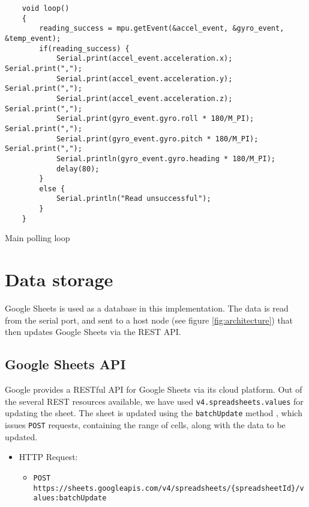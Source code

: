 \documentclass[./main.tex]{subfiles}
\begin{document}
\begin{code}
    \begin{verbatim}
    void loop()
    {
        reading_success = mpu.getEvent(&accel_event, &gyro_event, &temp_event);
        if(reading_success) {
            Serial.print(accel_event.acceleration.x); Serial.print(",");
            Serial.print(accel_event.acceleration.y); Serial.print(",");
            Serial.print(accel_event.acceleration.z); Serial.print(",");
            Serial.print(gyro_event.gyro.roll * 180/M_PI); Serial.print(",");
            Serial.print(gyro_event.gyro.pitch * 180/M_PI); Serial.print(",");
            Serial.println(gyro_event.gyro.heading * 180/M_PI);
            delay(80);
        }
        else {
            Serial.println("Read unsuccessful");
        }
    }
    \end{verbatim}
    \caption{Main polling loop}
    \label{code:ucloop}
\end{code}
\vspace{0.5cm}

\section{Data storage}\label{sec:implstr}
Google Sheets is used as a database in this implementation. The data is read
from the serial port, and sent to a host node (see figure
\ref{fig:architecture}) that then updates Google Sheets via the REST API.

\subsection{Google Sheets API}
Google provides a RESTful API for Google Sheets via its cloud platform. Out of
the several REST resources available, we have used
\texttt{v4.spreadsheets.values} for updating the sheet. The sheet is
updated using the \texttt{batchUpdate} method \cite{gsheetapi}, which issues
\texttt{POST} requests, containing the range of cells, along with the
data to be updated.

\begin{itemize}
    \item HTTP Request:
        \begin{itemize}
            \item {\small \texttt{POST https://sheets.googleapis.com/v4/spreadsheets/\{spreadsheetId\}/values:batchUpdate}}
        \end{itemize}
\end{itemize}
\end{document}
